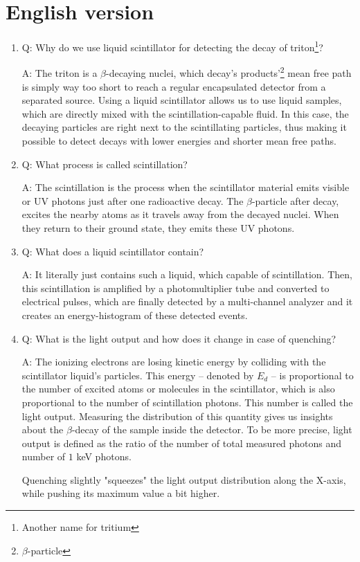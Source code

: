 \section{English version}
\begin{enumerate}
    \item Q: Why do we use liquid scintillator for detecting the decay of triton\footnote{Another name for tritium}? 
    \begin{displayquote}
        A: The triton is a $\beta$-decaying nuclei, which decay's products'\footnote{$\beta$-particle} mean free path is simply way too short to reach a regular encapsulated detector from a separated source. Using a liquid scintillator allows us to use liquid samples, which are directly mixed with the scintillation-capable fluid. In this case, the decaying particles are right next to the scintillating particles, thus making it possible to detect decays with lower energies and shorter mean free paths.
    \end{displayquote}
    
    \item Q: What process is called scintillation?
    \begin{displayquote}
        A: The scintillation is the process when the scintillator material emits visible or UV photons just after one radioactive decay. The $\beta$-particle after decay, excites the nearby atoms as it travels away from the decayed nuclei. When they return to their ground state, they emits these UV photons.
    \end{displayquote}
    
    \item Q: What does a liquid scintillator contain?
    \begin{displayquote}
        A: It literally just contains such a liquid, which capable of scintillation. Then, this scintillation is amplified by a photomultiplier tube and converted to electrical pulses, which are finally detected by a multi-channel analyzer and it creates an energy-histogram of these detected events.
    \end{displayquote}
    
    \item Q: What is the light output and how does it change in case of quenching?
    \begin{displayquote}
        A: The ionizing electrons are losing kinetic energy by colliding with the scintillator liquid's particles. This energy -- denoted by $E_{d}$ -- is proportional to the number of excited atoms or molecules in the scintillator, which is also proportional to the number of scintillation photons. This number is called the light output. Measuring the distribution of this quantity gives us insights about the $\beta$-decay of the sample inside the detector. To be more precise, light output is defined as the ratio of the number of total measured photons and number of $1$ keV photons. \par
Quenching slightly "squeezes" the light output distribution along the X-axis, while pushing its maximum value a bit higher.
    \end{displayquote}
    

\end{enumerate}
